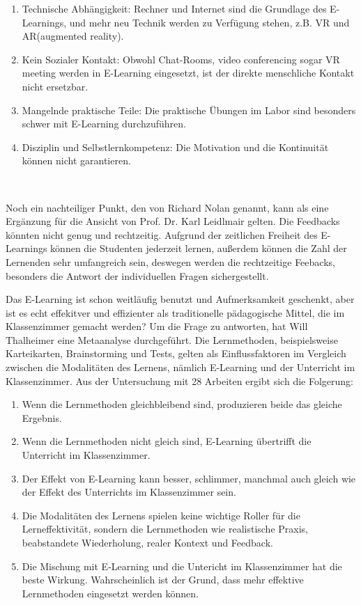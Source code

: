 \begin{enumerate}
\item Technische Abhängigkeit: Rechner und Internet sind die Grundlage des E-Learnings, und mehr neu Technik werden zu Verfügung stehen, z.B. VR und AR(augmented reality).
\item Kein Sozialer Kontakt: Obwohl Chat-Rooms, video conferencing sogar VR meeting werden in E-Learning eingesetzt, ist der direkte menschliche Kontakt nicht ersetzbar.
\item Mangelnde praktische Teile: Die praktische Übungen im Labor sind besonders schwer mit E-Learning durchzuführen.
\item Disziplin und Selbstlernkompetenz: Die Motivation und die Kontinuität können nicht garantieren.
\end{enumerate}\

Noch ein nachteiliger Punkt, den von Richard Nolan\citep{5} genannt, kann als eine Ergänzung für die Ansicht von Prof. Dr. Karl Leidlmair gelten. Die Feedbacks könnten nicht genug und rechtzeitig. Aufgrund der zeitlichen Freiheit des E-Learnings können die Studenten jederzeit lernen, außerdem können die Zahl der Lernenden sehr umfangreich sein, deswegen werden die rechtzeitige Feebacks, besonders die Antwort der individuellen Fragen sichergestellt.

Das E-Learning ist schon weitläufig benutzt und Aufmerksamkeit geschenkt, aber ist es echt effekitver und effizienter als traditionelle pädagogische Mittel, die im Klassenzimmer gemacht werden? Um die Frage zu antworten, hat Will Thalheimer\citep{8} eine Metaanalyse durchgeführt. Die Lernmethoden, beispielsweise Karteikarten, Brainstorming und Tests, gelten als Einflussfaktoren im Vergleich zwischen die Modalitäten des Lernens, nämlich E-Learning und der Unterricht im Klassenzimmer. Aus der Untersuchung mit 28 Arbeiten ergibt sich die Folgerung:

\begin{enumerate}
\item Wenn die Lernmethoden gleichbleibend sind, produzieren beide das gleiche Ergebnis.
\item Wenn die Lernmethoden nicht gleich sind, E-Learning übertrifft die Unterricht im Klassenzimmer.
\item Der Effekt von E-Learning kann besser, schlimmer, manchmal auch gleich wie der Effekt des Unterrichts im Klassenzimmer sein.
\item Die Modalitäten des Lernens spielen keine wichtige Roller für die Lerneffektivität, sondern die Lernmethoden wie realistische Praxis, beabstandete Wiederholung, realer Kontext und Feedback.
\item Die Mischung mit E-Learning und die Untericht im Klassenzimmer hat die beste Wirkung. Wahrscheinlich ist der Grund, dass mehr effektive Lernmethoden eingesetzt werden können. 
\end{enumerate}\

